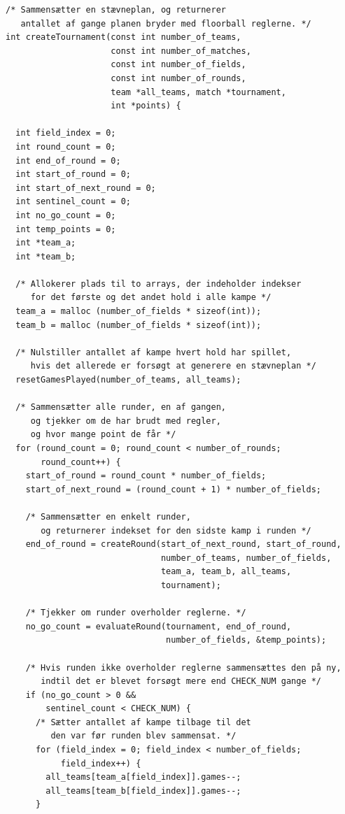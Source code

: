 \clearpage

\begin{source}
\begin{verbatim} 
/* Sammensætter en stævneplan, og returnerer 
   antallet af gange planen bryder med floorball reglerne. */
int createTournament(const int number_of_teams, 
                     const int number_of_matches, 
                     const int number_of_fields, 
                     const int number_of_rounds, 
                     team *all_teams, match *tournament, 
                     int *points) {
                     
  int field_index = 0;
  int round_count = 0;
  int end_of_round = 0;
  int start_of_round = 0;
  int start_of_next_round = 0;
  int sentinel_count = 0;
  int no_go_count = 0;
  int temp_points = 0;
  int *team_a;
  int *team_b;

  /* Allokerer plads til to arrays, der indeholder indekser
     for det første og det andet hold i alle kampe */
  team_a = malloc (number_of_fields * sizeof(int));
  team_b = malloc (number_of_fields * sizeof(int));

  /* Nulstiller antallet af kampe hvert hold har spillet,
     hvis det allerede er forsøgt at generere en stævneplan */
  resetGamesPlayed(number_of_teams, all_teams);

  /* Sammensætter alle runder, en af gangen,
     og tjekker om de har brudt med regler, 
     og hvor mange point de får */
  for (round_count = 0; round_count < number_of_rounds; 
       round_count++) {
    start_of_round = round_count * number_of_fields;
    start_of_next_round = (round_count + 1) * number_of_fields;

    /* Sammensætter en enkelt runder, 
       og returnerer indekset for den sidste kamp i runden */
    end_of_round = createRound(start_of_next_round, start_of_round, 
                               number_of_teams, number_of_fields, 
                               team_a, team_b, all_teams, 
                               tournament);

    /* Tjekker om runder overholder reglerne. */
    no_go_count = evaluateRound(tournament, end_of_round, 
                                number_of_fields, &temp_points);

    /* Hvis runden ikke overholder reglerne sammensættes den på ny,
       indtil det er blevet forsøgt mere end CHECK_NUM gange */
    if (no_go_count > 0 && 
        sentinel_count < CHECK_NUM) {
      /* Sætter antallet af kampe tilbage til det 
         den var før runden blev sammensat. */
      for (field_index = 0; field_index < number_of_fields; 
           field_index++) {
        all_teams[team_a[field_index]].games--;
        all_teams[team_b[field_index]].games--;
      }


\end{verbatim}
\end{source}
